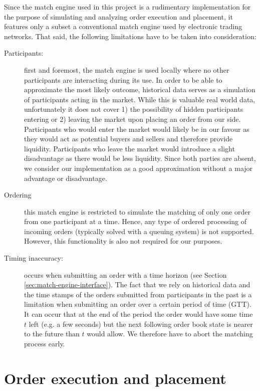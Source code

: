 Since the match engine used in this project is a rudimentary implementation for the purpose of simulating and analyzing order execution and placement, it features only a subset a conventional match engine used by electronic trading networks.
That said, the following limitations have to be taken into consideration:
\begin{description}
    \item[Participants:] first and foremost, the match engine is used locally where no other participants are interacting during its use.
    In order to be able to approximate the most likely outcome, historical data serves as a simulation of participants acting in the market.
    While this is valuable real world data, unfortunately it does not cover 1) the possibility of hidden participants entering or 2) leaving the market upon placing an order from our side.
    Participants who would enter the market would likely be in our favour as they would act as potential buyers and sellers and therefore provide liquidity.
    Participants who leave the market would introduce a slight disadvantage as there would be less liquidity.
    Since both parties are absent, we consider our implementation as a good approximation without a major advantage or disadvantage.
    
    \item[Ordering] this match engine is restricted to simulate the matching of only one order from one participant at a time.
    Hence, any type of ordered processing of incoming orders (typically solved with a queuing system) is not supported.
    However, this functionality is also not required for our purposes.
    
    \item[Timing inaccuracy:] occurs when submitting an order with a time horizon (see Section \ref{sec:match-engine-interface}).
    The fact that we rely on historical data and the time stamps of the orders submitted from participants in the past is a limitation when submitting an order over a certain period of time (GTT).
    It can occur that at the end of the period the order would have some time $t$ left (e.g. a few seconds) but the next following order book state is nearer to the future than $t$ would allow.
    We therefore have to abort the matching process early.
    
\end{description}

\section{Order execution and placement}
\label{sec:execution-placement}


